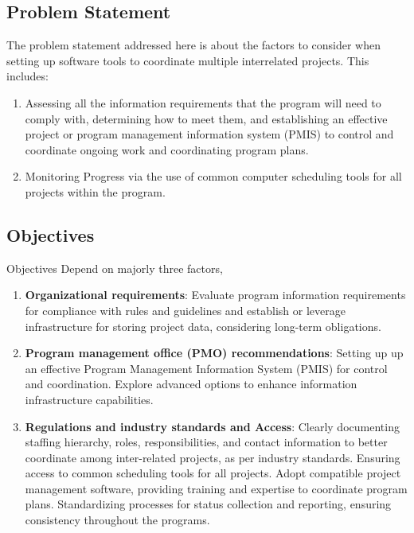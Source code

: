 \documentclass{llncs}
\begin{document}
\subsection{Problem Statement}
The problem statement addressed here is about the factors to consider when setting up software tools to coordinate multiple interrelated projects. This includes:
\begin{enumerate}
  \item Assessing all the information requirements that the program will need to comply with, determining how to meet them, and establishing an effective project or program management information system (PMIS) to control and coordinate ongoing work and coordinating program plans.

 \item Monitoring Progress via the use of common computer scheduling tools for all projects within the program.

\end{enumerate}


\subsection{Objectives}
Objectives Depend on majorly three factors,
\begin{enumerate}
\item \textbf{Organizational requirements}:
\subitem Evaluate program information requirements for compliance with rules and guidelines and establish or leverage infrastructure for storing project data, considering long-term obligations.
\item \textbf{Program management office (PMO) recommendations}: \subitem Setting up up an effective Program Management Information System (PMIS) for control and coordination.
\subitem Explore advanced options to enhance information infrastructure capabilities.
\item \textbf{Regulations and industry standards and Access}:
\subitem Clearly documenting staffing hierarchy, roles, responsibilities, and contact information to better coordinate among inter-related projects, as per industry standards.
\subitem Ensuring access to common scheduling tools for all projects.
\subitem Adopt compatible project management software, providing training and expertise to coordinate program plans.
\subitem Standardizing processes for status collection and reporting, ensuring consistency throughout the programs.

\end{enumerate}
\end{document}
